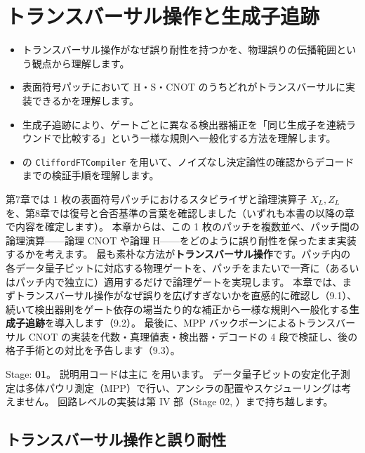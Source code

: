\chapter{トランスバーサル操作と生成子追跡}\label{ch:transversal}

\begin{chaptergoal}
  \begin{itemize}
  \item トランスバーサル操作がなぜ誤り耐性を持つかを、物理誤りの伝播範囲という観点から理解します。
  \item 表面符号パッチにおいて H・S・CNOT のうちどれがトランスバーサルに実装できるかを理解します。
  \item 生成子追跡により、ゲートごとに異なる検出器補正を「同じ生成子を連続ラウンドで比較する」という一様な規則へ一般化する方法を理解します。
  \item {} の \texttt{CliffordFTCompiler} を用いて、ノイズなし決定論性の確認からデコードまでの検証手順を理解します。
  \end{itemize}
\end{chaptergoal}

第7章では 1 枚の表面符号パッチにおけるスタビライザと論理演算子 $X_L, Z_L$ を、第8章では復号と合否基準の言葉を確認しました（いずれも本書の以降の章で内容を確定します）。
本章からは、この 1 枚のパッチを複数並べ、パッチ間の論理演算——論理 CNOT や論理 H——をどのように誤り耐性を保ったまま実装するかを考えます。
最も素朴な方法が\textbf{トランスバーサル操作}です。パッチ内の各データ量子ビットに対応する物理ゲートを、パッチをまたいで一斉に（あるいはパッチ内で独立に）適用するだけで論理ゲートを実現します。
本章では、まずトランスバーサル操作がなぜ誤りを広げすぎないかを直感的に確認し（9.1）、続いて検出器則をゲート依存の場当たり的な補正から一様な規則へ一般化する\textbf{生成子追跡}を導入します（9.2）。
最後に、MPP バックボーンによるトランスバーサル CNOT の実装を代数・真理値表・検出器・デコードの 4 段で検証し、後の格子手術との対比を予告します（9.3）。

\begin{notebox}
  Stage: \textbf{01}。
  説明用コードは主に  を用います。
  データ量子ビットの安定化子測定は多体パウリ測定（MPP）で行い、アンシラの配置やスケジューリングは考えません。
  回路レベルの実装は第 IV 部（Stage 02, ）まで持ち越します。
\end{notebox}

\section{トランスバーサル操作と誤り耐性}\label{sec:transversal}

